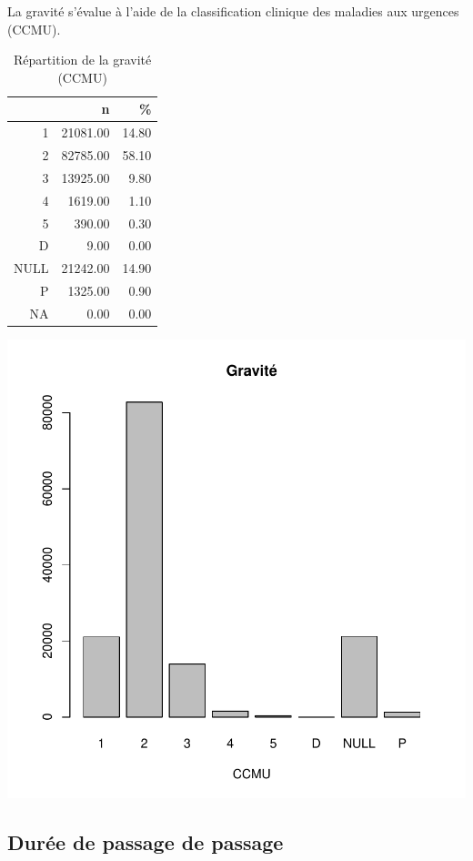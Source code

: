 \documentclass[12pt,english,french]{report}
\begin{document}
La gravité s'évalue à l'aide de la classification clinique des maladies aux urgences (CCMU).
\begin{table}[ht]
\centering
\begin{tabular}{rrr}
  \hline
 & n & \% \\ 
  \hline
1 & 21081.00 & 14.80 \\ 
  2 & 82785.00 & 58.10 \\ 
  3 & 13925.00 & 9.80 \\ 
  4 & 1619.00 & 1.10 \\ 
  5 & 390.00 & 0.30 \\ 
  D & 9.00 & 0.00 \\ 
  NULL & 21242.00 & 14.90 \\ 
  P & 1325.00 & 0.90 \\ 
  NA & 0.00 & 0.00 \\ 
   \hline
\end{tabular}
\caption{Répartition de la gravité (CCMU)} 
\label{ccmu}
\end{table}\includegraphics{rpu2012-gravite1}

%
%
\subsection{Durée de passage de passage}
\end{document}

